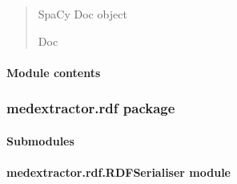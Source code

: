 \documentclass[letterpaper,10pt,english]{sphinxmanual}
\begin{document}
\begin{fulllineitems}
\begin{fulllineitems}
\begin{quote}
\begin{description}
\sphinxAtStartPar
{} \textendash{} SpaCy Doc object

\sphinxAtStartPar
Doc

\end{description}\end{quote}

\end{fulllineitems}


\end{fulllineitems}



\paragraph{Module contents}
\label{\detokenize{medextractor.preprocessor:module-medextractor.preprocessor}}\label{\detokenize{medextractor.preprocessor:module-contents}}
\sphinxstepscope


\subsubsection{medextractor.rdf package}
\label{\detokenize{medextractor.rdf:medextractor-rdf-package}}\label{\detokenize{medextractor.rdf::doc}}

\paragraph{Submodules}
\label{\detokenize{medextractor.rdf:submodules}}

\paragraph{medextractor.rdf.RDFSerialiser module}
\label{\detokenize{medextractor.rdf:module-medextractor.rdf.RDFSerialiser}}\label{\detokenize{medextractor.rdf:medextractor-rdf-rdfserialiser-module}}
\end{document}
